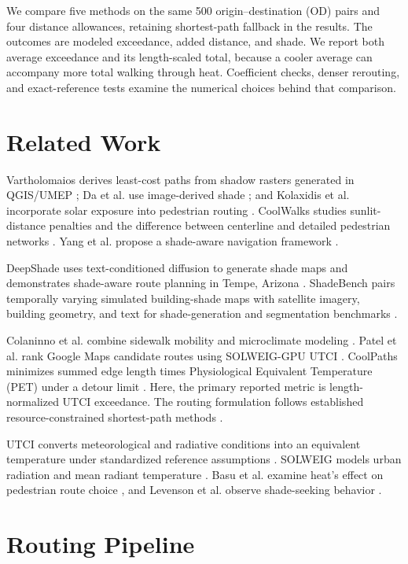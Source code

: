 \documentclass[sigconf,nonacm]{acmart}
\begin{document}
We compare five methods on the same 500 origin--destination (OD) pairs and four distance allowances, retaining shortest-path fallback in the results. The outcomes are modeled exceedance, added distance, and shade. We report both average exceedance and its length-scaled total, because a cooler average can accompany more total walking through heat. Coefficient checks, denser rerouting, and exact-reference tests examine the numerical choices behind that comparison.

\section{Related Work}
Vartholomaios derives least-cost paths from shadow rasters generated in QGIS/UMEP \citep{vartholomaios2023}; Da et al. use image-derived shade \citep{da2024}; and Kolaxidis et al. incorporate solar exposure into pedestrian routing \citep{kolaxidis2025}. CoolWalks studies sunlit-distance penalties and the difference between centerline and detailed pedestrian networks \citep{wolf2025}. Yang et al. propose a shade-aware navigation framework \citep{yang2025}.

DeepShade uses text-conditioned diffusion to generate shade maps and demonstrates shade-aware route planning in Tempe, Arizona \citep{da2025deepshade}. ShadeBench pairs temporally varying simulated building-shade maps with satellite imagery, building geometry, and text for shade-generation and segmentation benchmarks \citep{da2026shadebench}.

Colaninno et al. combine sidewalk mobility and microclimate modeling \citep{colaninno2025}. Patel et al. rank Google Maps candidate routes using SOLWEIG-GPU UTCI \citep{patel2026}. CoolPaths minimizes summed edge length times Physiological Equivalent Temperature (PET) under a detour limit \citep{verma2026}. Here, the primary reported metric is length-normalized UTCI exceedance. The routing formulation follows established resource-constrained shortest-path methods \citep{irnich2005}.

UTCI converts meteorological and radiative conditions into an equivalent temperature under standardized reference assumptions \citep{brode2012}. SOLWEIG models urban radiation and mean radiant temperature \citep{lindberg2008}. Basu et al. examine heat's effect on pedestrian route choice \citep{basu2024}, and Levenson et al. observe shade-seeking behavior \citep{levenson2025}.

\section{Routing Pipeline}
\end{document}
